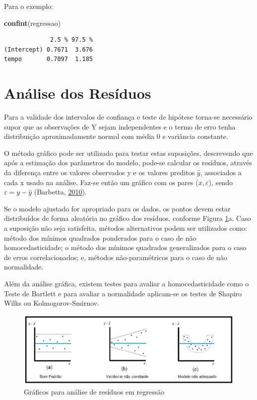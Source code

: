\documentclass[12pt,brazil,oneside]{book}
\newenvironment{Shaded}{\begin{snugshade}}{\end{snugshade}}
\newcommand{\KeywordTok}[1]{\textcolor[rgb]{0.13,0.29,0.53}{\textbf{#1}}}
\newcommand{\NormalTok}[1]{#1}
\begin{document}
Para o exemplo:

\begin{Shaded}
\begin{Highlighting}[]
\KeywordTok{confint}\NormalTok{(regressao)}
\end{Highlighting}
\end{Shaded}

\begin{verbatim}
             2.5 % 97.5 %
(Intercept) 0.7671  3.676
tempo       0.7097  1.185
\end{verbatim}

\hypertarget{analise-dos-residuos}{%
\section{Análise dos Resíduos}\label{analise-dos-residuos}}

Para a validade dos intervalos de confiança e teste de hipótese torna-se necessário supor que as observações de Y sejam independentes e o termo de erro tenha distribuição aproximadamente normal com média 0 e variância constante.

O método gráfico pode ser utilizado para testar estas suposições, descrevendo que após a estimação dos parâmetros do modelo, pode-se calcular os resíduos, através da diferença entre os valores observados y e os valores preditos \(\hat{y}\), associados a cada x usado na análise. Faz-se então um gráfico com os pares (\(x,\varepsilon\)), sendo \(\varepsilon = y -\hat{y}\) (Barbetta, \protect\hyperlink{ref-barbetta1988}{2010}).

Se o modelo ajustado for apropriado para os dados, os pontos devem estar
distribuídos de forma aleatória no gráfico dos resíduos, conforme Figura \ref{fig:residuos}a. Caso a suposição não seja satisfeita, métodos alternativos podem ser utilizados como: método dos mínimos quadrados ponderados para o caso de não homocedasticidade; o método dos mínimos quadrados generalizados para o caso de erros correlacionados; e, métodos não-paramétricos para o caso de não normalidade.

Além da análise gráfica, existem testes para avaliar a homocedasticidade como o Teste de Bartlett e para avaliar a normalidade aplicam-se os testes de Shapiro Wilks ou Kolmogorov-Smirnov.

\begin{figure}[H]

{\centering \includegraphics[width=0.7\linewidth]{residuos1} 

}

\caption{Gráficos para análise de resíduos em regressão}\label{fig:residuos}
\end{figure}
\end{document}
